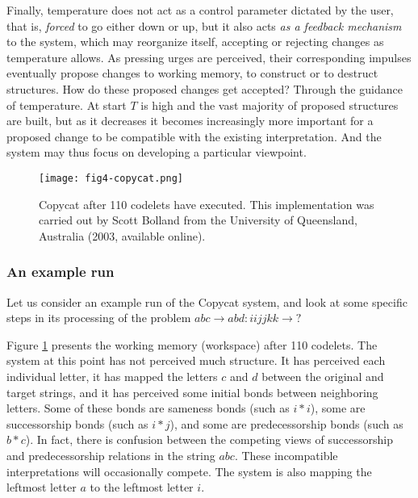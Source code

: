 \documentclass[a4paper]{article}
\begin{document}
\begin{enumerate}
Finally, temperature does not act as a control parameter dictated by the user, that is, \emph{forced} to go either down or up, but it also acts \emph{as a feedback mechanism} to the system, which may reorganize itself, accepting or rejecting changes as temperature allows.  As pressing urges are perceived, their corresponding impulses eventually propose changes to working memory, to construct or to destruct structures.  How do these proposed changes get accepted?  Through the guidance of temperature.  At start $T$ is high and the vast majority of proposed structures are built, but as it decreases it becomes increasingly more important for a proposed change to be compatible with the existing interpretation.  And the system may thus focus on developing a particular viewpoint.

\end{enumerate}

\begin{figure}
\centering
\texttt{[image: fig4-copycat.png]}
\caption{\label{fig:run-1}Copycat after 110 codelets have executed.  This implementation was carried out by Scott Bolland from the University of Queensland, Australia (2003, available online).}
\end{figure}

\subsubsection{An example run}

Let us consider an example run of the Copycat system, and look at some specific steps in its processing of the problem $abc\to abd : iijjkk \to ?$  




Figure \ref{fig:run-1} presents the working memory (workspace) after 110 codelets.  The system at this point has not perceived much structure.  It has perceived each individual letter, it has mapped the letters $c$ and $d$ between the original and target strings, and it has perceived some initial bonds between neighboring letters.  Some of these bonds are sameness bonds (such as $i*i$), some are successorship bonds (such as $i*j$), and some are predecessorship bonds (such as $b*c$).  In fact, there is confusion between the competing views of successorship and predecessorship relations in the string $abc$.  These incompatible interpretations will occasionally compete.  The system is also mapping the leftmost letter $a$ to the leftmost letter $i$.
\end{document}
